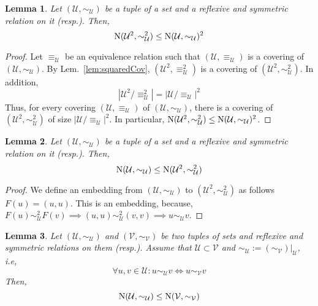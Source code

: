 \documentclass{article} %
\newtheorem{lem}{Lemma}
\newcommand{\Cov}{\textnormal{N}}
\begin{document}
 

\begin{lem}\label{lem:squaredCovering} Let $(\mathcal{U},\sim_\mathcal{U})$ be a tuple of a set and a reflexive and symmetric relation on it (resp.). Then,
\begin{equation}
\Cov(\mathcal{U}^2,\sim^2_{\mathcal{U}}) \leq \Cov(\mathcal{U},\sim_{\mathcal{U}})^2
\end{equation}
\end{lem}

 

\begin{proof} Let $\equiv_{\mathcal{U}}$ be an equivalence relation such that $(\mathcal{U},\equiv_\mathcal{U})$ is a covering of $(\mathcal{U},\sim_\mathcal{U})$. By Lem.~\ref{lem:squaredCov}, $(\mathcal{U}^2,\equiv^2_{\mathcal{U}})$ is a covering of $(\mathcal{U}^2,\sim^2_{\mathcal{U}})$. In addition, 
\begin{equation}
|\mathcal{U}^2/\equiv^2_{\mathcal{U}}| = |\mathcal{U}/\equiv_{\mathcal{U}}|^2
\end{equation}
Thus, for every covering $(\mathcal{U},\equiv_\mathcal{U})$ of $(\mathcal{U},\sim_\mathcal{U})$, there is a covering of $(\mathcal{U}^2,\sim^2_{\mathcal{U}})$ of size $|\mathcal{U}/\equiv_{\mathcal{U}}|^2$. In particular, $\Cov(\mathcal{U}^2,\sim^2_{\mathcal{U}}) \leq \Cov(\mathcal{U},\sim_{\mathcal{U}})^2$.
\end{proof}

 

\begin{lem}\label{lem:squaredCovering2} Let $(\mathcal{U},\sim_\mathcal{U})$ be a tuple of a set and a reflexive and symmetric relation on it (resp.). Then,
\begin{equation}
\Cov(\mathcal{U},\sim_{\mathcal{U}}) \leq \Cov(\mathcal{U}^2,\sim^2_{\mathcal{U}}) 
\end{equation}
\end{lem}


\begin{proof} We define an embedding from $(\mathcal{U},\sim_{\mathcal{U}})$ to $(\mathcal{U}^2,\sim^2_{\mathcal{U}})$ as follows $F(u) = (u,u)$. This is an embedding, because, $F(u) \sim^2_{\mathcal{U}}  F(v) \implies (u,u) \sim^2_{\mathcal{U}}  (v,v) \implies u \sim_{\mathcal{U}} v$.
\end{proof}


\begin{lem}\label{lem:covSubset} Let $(\mathcal{U},\sim_\mathcal{U})$ and $(\mathcal{V},\sim_\mathcal{V})$ be two tuples of sets and reflexive and symmetric relations on them (resp.). Assume that $\mathcal{U} \subset \mathcal{V}$ and $\sim_{\mathcal{U}} := (\sim_{\mathcal{V}}) \big\vert_{\mathcal{U}}$, i.e, 
\begin{equation}
\forall u,v \in \mathcal{U}: u \sim_{\mathcal{U}} v \iff u \sim_{\mathcal{V}} v
\end{equation}
Then, 
\begin{equation}
\Cov(\mathcal{U},\sim_{\mathcal{U}}) \leq \Cov(\mathcal{V},\sim_{\mathcal{V}})
\end{equation}
\end{lem}
\end{document}
